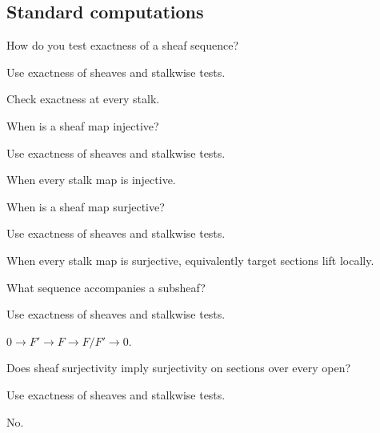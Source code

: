 \subsection*{Standard computations}

\begin{exercise}\label{exr:vi16-expand-01}
How do you test exactness of a sheaf sequence?
\end{exercise}
\begin{hint}
Use exactness of sheaves and stalkwise tests.
\end{hint}
\begin{solution}
Check exactness at every stalk.
\end{solution}

\begin{exercise}[Monomorphism]\label{exr:vi16-expand-02}
When is a sheaf map injective?
\end{exercise}
\begin{hint}
Use exactness of sheaves and stalkwise tests.
\end{hint}
\begin{solution}
When every stalk map is injective.
\end{solution}

\begin{exercise}[Epimorphism]\label{exr:vi16-expand-03}
When is a sheaf map surjective?
\end{exercise}
\begin{hint}
Use exactness of sheaves and stalkwise tests.
\end{hint}
\begin{solution}
When every stalk map is surjective, equivalently target sections lift locally.
\end{solution}

\begin{exercise}[Quotient]\label{exr:vi16-expand-04}
What sequence accompanies a subsheaf?
\end{exercise}
\begin{hint}
Use exactness of sheaves and stalkwise tests.
\end{hint}
\begin{solution}
$0\to F'\to F\to F/F'\to0$.
\end{solution}

\begin{exercise}\label{exr:vi16-expand-05}
Does sheaf surjectivity imply surjectivity on sections over every open?
\end{exercise}
\begin{hint}
Use exactness of sheaves and stalkwise tests.
\end{hint}
\begin{solution}
No.
\end{solution}

